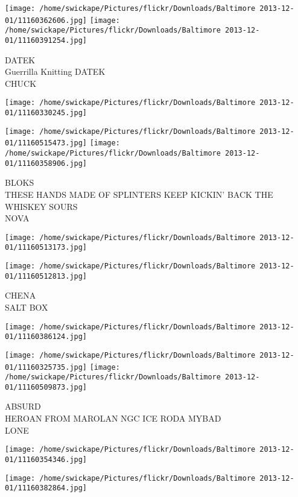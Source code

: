 \documentclass[10pt,letterpaper]{article}
\begin{document}
\vspace{0.25in}
\texttt{[image: /home/swickape/Pictures/flickr/Downloads/Baltimore 2013-12-01/11160362606.jpg]}
\texttt{[image: /home/swickape/Pictures/flickr/Downloads/Baltimore 2013-12-01/11160391254.jpg]}

DATEK\\
Guerrilla Knitting DATEK\\
CHUCK
\pagebreak

\texttt{[image: /home/swickape/Pictures/flickr/Downloads/Baltimore 2013-12-01/11160330245.jpg]}

\vspace{0.25in}
\texttt{[image: /home/swickape/Pictures/flickr/Downloads/Baltimore 2013-12-01/11160515473.jpg]}
\texttt{[image: /home/swickape/Pictures/flickr/Downloads/Baltimore 2013-12-01/11160358906.jpg]}

BLOKS\\
THESE HANDS MADE OF SPLINTERS KEEP KICKIN' BACK THE WHISKEY SOURS\\
NOVA
\pagebreak

\texttt{[image: /home/swickape/Pictures/flickr/Downloads/Baltimore 2013-12-01/11160513173.jpg]}

\vspace{0.25in}
\texttt{[image: /home/swickape/Pictures/flickr/Downloads/Baltimore 2013-12-01/11160512813.jpg]}

CHENA\\
SALT BOX
\pagebreak

\texttt{[image: /home/swickape/Pictures/flickr/Downloads/Baltimore 2013-12-01/11160386124.jpg]}

\vspace{0.25in}
\texttt{[image: /home/swickape/Pictures/flickr/Downloads/Baltimore 2013-12-01/11160325735.jpg]}
\texttt{[image: /home/swickape/Pictures/flickr/Downloads/Baltimore 2013-12-01/11160509873.jpg]}

ABSURD\\
HEROAN FROM MAROLAN NGC ICE RODA MYBAD\\
LONE
\pagebreak

\texttt{[image: /home/swickape/Pictures/flickr/Downloads/Baltimore 2013-12-01/11160354346.jpg]}

\vspace{0.25in}
\texttt{[image: /home/swickape/Pictures/flickr/Downloads/Baltimore 2013-12-01/11160382864.jpg]}
\end{document}
